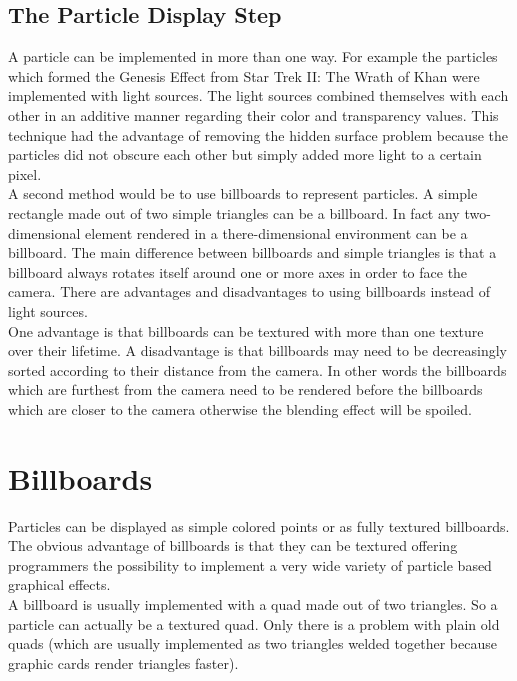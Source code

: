 \newpage
\subsection{The Particle Display Step}
A particle can be implemented in more than one way. For example the particles which formed the Genesis Effect from Star Trek II: The Wrath of Khan were implemented with light sources. The light sources combined themselves with each other in an additive manner regarding their color and transparency values. This technique had the advantage of removing the hidden surface problem because the particles did not obscure each other but simply added more light to a certain pixel.\\

A second method would be to use billboards to represent particles. A simple rectangle made out of two simple triangles can be a billboard. In fact any two-dimensional element rendered in a there-dimensional environment can be a billboard. The main difference between billboards and simple triangles is that a billboard always rotates itself around one or more axes in order to face the camera. There are advantages and disadvantages to using billboards instead of light sources.\\

One advantage is that billboards can be textured with more than one texture over their lifetime. A disadvantage is that billboards may need to be decreasingly sorted according to their distance from the camera. In other words the billboards which are furthest from the camera need to be rendered before the billboards which are closer to the camera otherwise the blending effect will be spoiled.\\

\newpage
\section{Billboards}
Particles can be displayed as simple colored points or as fully textured billboards. The obvious advantage of billboards is that they can be textured offering programmers the possibility to implement a very wide variety of particle based graphical effects.\\

A billboard is usually implemented with a quad made out of two triangles. So a particle can actually be a textured quad. Only there is a problem with plain old quads (which are usually implemented as two triangles welded together because graphic cards render triangles faster).\\

